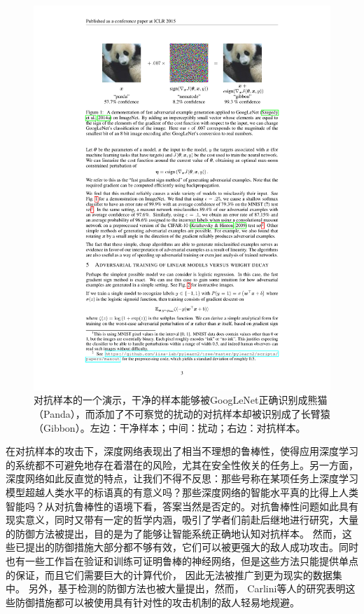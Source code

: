 \begin{figure}[h]
    \centering
    \includegraphics{fig/adversarial_example.pdf}
    \caption{对抗样本的一个演示，干净的样本能够被GoogLeNet\cite{szegedy2015going}正确识别成熊猫（Panda），而添加了不可察觉的扰动的对抗样本却被识别成了长臂猿（Gibbon）。左边：干净样本；中间：扰动；右边：对抗样本。}
    \label{fig:adversarial_example}
\end{figure}

在对抗样本的攻击下，深度网络表现出了相当不理想的鲁棒性，使得应用深度学习的系统都不可避免地存在着潜在的风险，尤其在安全性攸关的任务上。另一方面，深度网络如此反直觉的特点，让我们不得不反思：那些号称在某项任务上深度学习模型超越人类水平的标语真的有意义吗？那些深度网络的智能水平真的比得上人类智能吗？从对抗鲁棒性的语境下看，答案当然是否定的。对抗鲁棒性问题如此具有现实意义，同时又带有一定的哲学内涵，吸引了学者们前赴后继地进行研究，大量的防御方法被提出，目的是为了能够让智能系统正确地认知对抗样本\cite{szegedy2013intriguing, gu2014towards, madry2018towards, papernot2016distillation, rozsa2016adversarial, zheng2016improving}。 然而，这些已提出的防御措施大部分都不够有效，它们可以被更强大的敌人成功攻击\cite{carlini2017towards}。同时也有一些工作旨在验证和训练可证明鲁棒的神经网络，但是这些方法只能提供单点的保证，而且它们需要巨大的计算代价， 因此无法被推广到更为现实的数据集中\cite{raghunathan2018certified, pmlr-v80-wong18a, wong2018scaling}。 另外，基于检测的防御方法也被大量提出\cite{grosse2017statistical, gong2017adversarial, metzen2017detecting, li2017adversarial, feinman2017detecting}，然而， Carlini等人的研究\cite{carlini2017adversarial}表明这些防御措施都可以被使用具有针对性的攻击机制的敌人轻易地规避。

